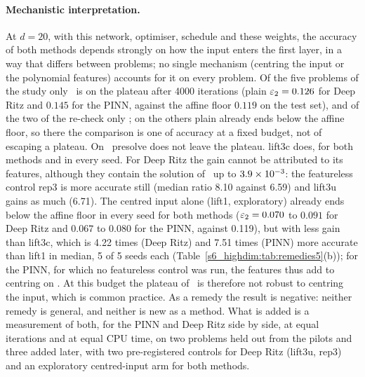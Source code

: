\paragraph{Mechanistic interpretation.} At $d=20$, with this network, optimiser,
schedule and these weights, the accuracy of both methods depends strongly on how the input enters
the first layer, in a way that differs between problems; no single mechanism (centring the input or
the polynomial features) accounts for it on every problem.
Of the five problems of the study only \Ptwo\ is on the plateau after 4000 iterations
(plain $\varepsilon_{2}=0.126$ for Deep Ritz and $0.145$ for the PINN, against the affine floor $0.119$ on
the test set), and of the two of the re-check only \Pexpcos; on the others plain already ends
below the affine floor, so there the comparison is
one of accuracy at a fixed budget, not of escaping a plateau.
On \Ptwo\ presolve does not leave the plateau. lift3c does, for both methods and in every seed.
For Deep Ritz the gain cannot be attributed to its features, although they contain the solution of
\Ptwo\ up to $3.9\times 10^{-3}$: the featureless control rep3 is more accurate still (median ratio
8.10 against 6.59) and lift3u gains as much (6.71). The centred input alone (lift1, exploratory)
already ends below the affine floor in every seed for both methods ($\varepsilon_{2}=0.070$ to $0.091$ for
Deep Ritz and $0.067$ to $0.080$ for the PINN, against 0.119), but with less gain than lift3c, which
is 4.22 times (Deep Ritz) and 7.51 times (PINN) more accurate than lift1 in median, 5 of 5 seeds
each (Table~\ref{s6_highdim:tab:remedies5}(b)); for the PINN, for which no featureless control was
run, the features thus add to centring on \Ptwo. At this budget the plateau of \Ptwo\ is therefore not robust to centring
the input, which is common practice. As a remedy the result is negative: neither remedy is general,
and neither is new as a method. What is added is a measurement of both, for the PINN and Deep Ritz
side by side, at equal iterations and at equal CPU time, on two problems held out from the pilots
and three added later, with two pre-registered controls for Deep Ritz (lift3u, rep3) and an
exploratory centred-input arm for both methods.

